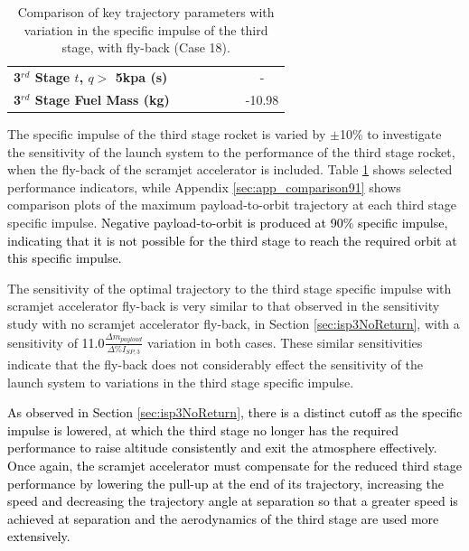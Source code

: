 \begin{table}[ht]
\begin{tabular}{l c c c c c c}
		\textbf{3$^{rd}$ Stage $t$, $q >$ 5kpa (s)}
		& \thirdqOverFiveISPThreeNinety
		& \thirdqOverFiveISPThreeNinetyFive
		& \thirdqOverFiveISPThreeStandard
		& \thirdqOverFiveISPThreeOneHundredFive
		& \thirdqOverFiveISPThreeOneHundredTen
		& -
		\\
		\textbf{3$^{rd}$ Stage Fuel Mass (kg)}
		& \thirdmFuelISPThreeNinety
		& \thirdmFuelISPThreeNinetyFive
		& \thirdmFuelISPThreeStandard
		& \thirdmFuelISPThreeOneHundredFive
		& \thirdmFuelISPThreeOneHundredTen
		&-10.98
		\\
		\hline 
	\end{tabular} 
	\caption{Comparison of key trajectory parameters with variation in the specific impulse of the third stage, with fly-back (Case 18).}
	\label{tab:isp3}
\end{table}


The specific impulse of the third stage rocket is varied by $\pm$10\% to investigate the sensitivity of the launch system to the performance of the third stage rocket, when the fly-back of the scramjet accelerator is included. 
Table \ref{tab:isp3} shows selected performance indicators, while Appendix \ref{sec:app_comparison91} shows comparison plots of the maximum payload-to-orbit trajectory at each third stage specific impulse. \textcolor{black}{Negative payload-to-orbit is produced at 90\% specific impulse, indicating that it is not possible for the third stage to reach the required orbit at this specific impulse. }

The sensitivity of the optimal trajectory to the third stage specific impulse with scramjet accelerator fly-back is very similar to that observed in the sensitivity study with no scramjet accelerator fly-back, in Section \ref{sec:isp3NoReturn}, with a sensitivity of \textcolor{black}{11.0}$\frac{\Delta m_{payload}}{\Delta\%I_{SP,3}}$ variation in both cases. 
These similar sensitivities indicate that the fly-back does not considerably effect the sensitivity of the launch system to variations in the third stage specific impulse.

\textcolor{black}{As observed in Section \ref{sec:isp3NoReturn}, there is a distinct cutoff as the specific impulse is lowered, at which the third stage no longer has the required performance to raise altitude consistently and exit the atmosphere effectively. Once again, the scramjet accelerator must compensate for the reduced third stage performance by lowering the pull-up at the end of its trajectory, increasing the speed and decreasing the trajectory angle at separation so that a greater speed is achieved at separation and the aerodynamics of the third stage are used more extensively.} 






